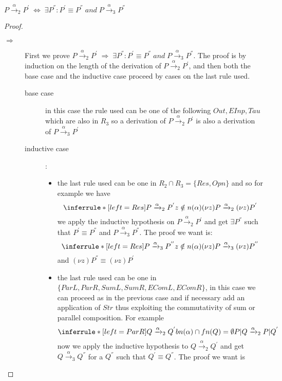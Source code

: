 \begin{theorem}
  $P\xrightarrow{\alpha}_{2}P^{'}\; \Leftrightarrow\; \exists P^{''}: P^{'}\equiv P^{''}\; and\; P\xrightarrow{\alpha}_{3}P^{''}$
  \begin{proof}
    \begin{description}
      \item[$\Rightarrow$] 
	First we prove $P\xrightarrow{\alpha}_{2}P^{'}\; \Rightarrow\; \exists P^{''}: P^{'}\equiv P^{''}\; and\; P\xrightarrow{\alpha}_{3}P^{''}$. The proof is by induction on the length of the derivation of $P\xrightarrow{\alpha}_{2}P^{'}$, and then both the base case and the inductive case proceed by cases on the last rule used.
	\begin{description}
	  \item[base case]
	    in this case the rule used can be one of the following $Out, EInp, Tau$ which are also in $R_{3}$ so a derivation of $P\xrightarrow{\alpha}_{2}P^{'}$ is also a derivation of $P\xrightarrow{\alpha}_{3}P^{'}$
	  \item[inductive case]:
	    \begin{itemize}
	      \item 
		the last rule used can be one in $R_{2}\cap R_{3}=\{Res, Opn\}$ and so for example we have 
		\[
		  \inferrule* [left=Res]{
		      P\xrightarrow{\alpha}_{2} P^{'}
		    \\
		      z\notin n(\alpha)
		  }{
		    (\nu z) P\xrightarrow{\alpha}_{2}(\nu z) P^{'}
		  }
		\]
		we apply the inductive hypothesis on $P\xrightarrow{\alpha}_{2} P^{'}$ and get $\exists P^{''}$ such that $P^{'}\equiv P^{''}$ and $P\xrightarrow{\alpha}_{3} P^{''}$. The proof we want is:
		\[
		  \inferrule* [left=Res]{
		      P\xrightarrow{\alpha}_{3} P^{''}
		    \\
		      z\notin n(\alpha)
		  }{
		    (\nu z) P\xrightarrow{\alpha}_{3}(\nu z) P^{''}
		  }
		\]
		and $(\nu z) P^{''}\equiv (\nu z) P^{'}$
	      \item
		the last rule used can be one in $\{ParL, ParR, SumL, SumR, EComL, EComR\}$, in this case we can proceed as in the previous case and if necessary add an application of $Str$ thus exploiting the commutativity of sum or parallel composition. For example
		\[
		  \inferrule* [left=ParR]{
		      Q\xrightarrow{\alpha}_{2}Q^{'}
		    \\
		      bn(\alpha)\cap fn(Q)=\emptyset
		  }{
		      P|Q\xrightarrow{\alpha}_{2}P|Q^{'}
		  }
		\]	
		now we apply the inductive hypothesis to $Q\xrightarrow{\alpha}_{2}Q^{'}$ and get $Q\xrightarrow{\alpha}_{3}Q^{''}$ for a $Q^{''}$ such that $Q^{'}\equiv Q^{''}$. The proof we want is

\end{itemize}
\end{description}
\end{description}
\end{proof}
\end{theorem}
